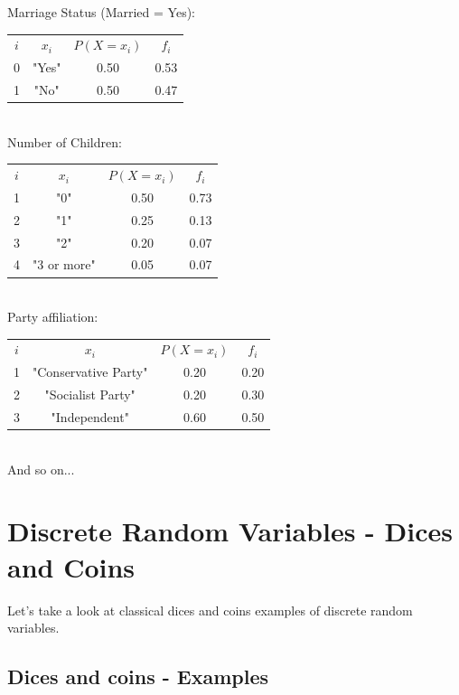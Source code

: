 \documentclass[11pt]{article}
\begin{document}
Marriage Status (Married = Yes):\\

\begin{tabular}{|c|c|c|c|}
\hline
	$i$ & $x_i$ & $P(X=x_i)$ & $f_i$\\
	\cline{1-4}
	0 & "Yes" & 0.50 & 0.53\\
	1 & "No" & 0.50 & 0.47\\
\hline
\end{tabular}\newline\\

Number of Children:\\

\begin{tabular}{|c|c|c|c|}
\hline
	$i$ & $x_i$ & $P(X=x_i)$ & $f_i$\\
	\cline{1-4}
	1 & "0" & 0.50 & 0.73\\
	2 & "1" & 0.25 & 0.13\\
	3 & "2" & 0.20 & 0.07\\
	4 & "3 or more" & 0.05 & 0.07\\	
\hline
\end{tabular}\newline\\

Party affiliation:\\

\begin{tabular}{|c|c|c|c|}
\hline
	$i$ & $x_i$ & $P(X=x_i)$ & $f_i$\\
	\cline{1-4}
	1 & "Conservative Party" & 0.20 & 0.20\\
	2 & "Socialist Party" & 0.20 & 0.30\\
	3 & "Independent" & 0.60 & 0.50\\
\hline
\end{tabular}\newline\\

And so on...

\section*{Discrete Random Variables - Dices and Coins}

	Let's take a look at classical dices and coins examples of discrete random variables.

	\subsection*{Dices and coins - Examples}
		
\end{document}
